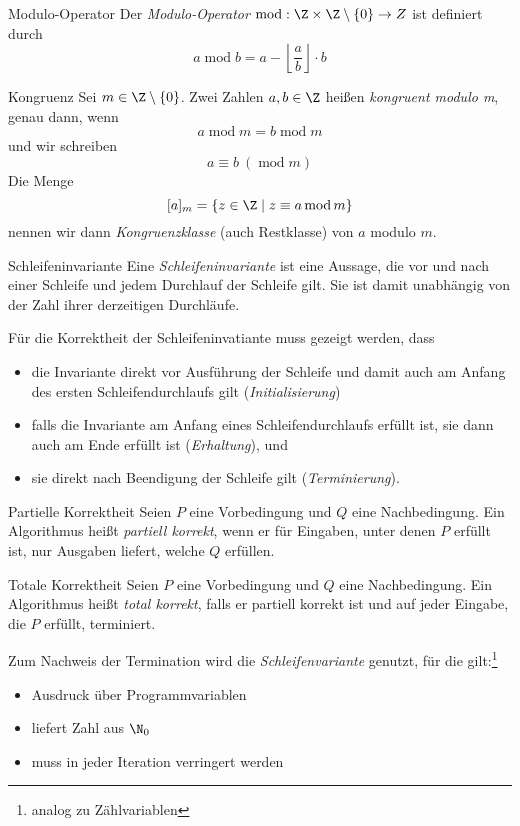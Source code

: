 \documentclass[german]{spicker}
\begin{document}
\begin{bonus}{Modulo-Operator}
  Der \emph{Modulo-Operator} $\operatorname{mod} : \Z \times \Z \setminus \{0\} \to Z$ ist definiert durch
  $$
    a \operatorname{mod} b = a - \left\lfloor \frac{a}{b} \right\rfloor \cdot b
  $$
\end{bonus}

\begin{bonus}{Kongruenz}
  Sei $m \in \Z \setminus \{0\}$.
  Zwei Zahlen $a, b \in \Z$ heißen \emph{kongruent modulo m}, genau dann, wenn
  $$
    a \operatorname{mod} m = b \operatorname{mod} m
  $$
  und wir schreiben
  $$
    a \equiv b \ (\operatorname{mod} m)
  $$
  Die Menge
  $$
    [a]_m = \{z \in \Z \mid z \equiv a \operatorname{mod} m\}
  $$
  nennen wir dann \emph{Kongruenzklasse} (auch Restklasse) von $a$ modulo $m$.
\end{bonus}

\begin{defi}{Schleifeninvariante}
  Eine \emph{Schleifeninvariante} ist eine Aussage, die vor und nach einer Schleife und jedem Durchlauf der Schleife gilt.
  Sie ist damit unabhängig von der Zahl ihrer derzeitigen Durchläufe.

  Für die Korrektheit der Schleifeninvatiante muss gezeigt werden, dass
  \begin{itemize}
    \item die Invariante direkt vor Ausführung der Schleife und damit auch am Anfang des ersten Schleifendurchlaufs gilt (\emph{Initialisierung})
    \item falls die Invariante am Anfang eines Schleifendurchlaufs erfüllt ist, sie dann auch am Ende erfüllt ist (\emph{Erhaltung}), und
    \item sie direkt nach Beendigung der Schleife gilt (\emph{Terminierung}).
  \end{itemize}
\end{defi}

\begin{defi}{Partielle Korrektheit}
  Seien $P$ eine Vorbedingung und $Q$ eine Nachbedingung.
  Ein Algorithmus heißt \emph{partiell korrekt}, wenn er für Eingaben, unter denen $P$ erfüllt ist, nur Ausgaben liefert, welche $Q$ erfüllen.

\end{defi}

\begin{defi}{Totale Korrektheit}
  Seien $P$ eine Vorbedingung und $Q$ eine Nachbedingung.
  Ein Algorithmus heißt \emph{total korrekt}, falls er partiell korrekt ist und auf jeder Eingabe, die $P$ erfüllt, terminiert.

  Zum Nachweis der Termination wird die \emph{Schleifenvariante} genutzt, für die gilt:\footnote{analog zu Zählvariablen}
  \begin{itemize}
    \item Ausdruck über Programmvariablen
    \item liefert Zahl aus $\N_0$
    \item muss in jeder Iteration verringert werden
  \end{itemize}
\end{defi}
\end{document}
